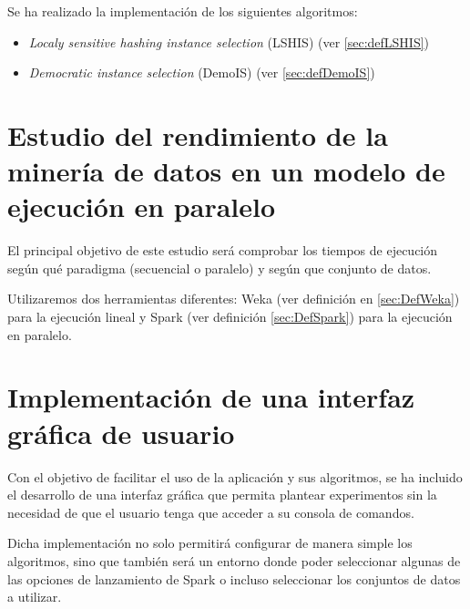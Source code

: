 Se ha realizado la implementación de los siguientes algoritmos:

\begin{itemize}
	\item \textit{Localy sensitive hashing instance selection} (LSHIS) (ver \ref{sec:defLSHIS}) \cite{LSHISPaper}
	\item \textit{Democratic instance selection} (DemoIS) (ver \ref{sec:defDemoIS}) \cite{DemoISPaper}
\end{itemize}


\section{Estudio del rendimiento de la minería de datos en un modelo de ejecución en paralelo}

El principal objetivo de este estudio será comprobar los tiempos de ejecución según qué paradigma (secuencial o paralelo) y según que conjunto de datos.

Utilizaremos dos herramientas diferentes: Weka (ver definición en \ref{sec:DefWeka}) para la ejecución lineal y Spark (ver definición \ref{sec:DefSpark}) para la ejecución en paralelo.




\section{Implementación de una interfaz gráfica de usuario}

Con el objetivo de facilitar el uso de la aplicación y sus algoritmos, se ha incluido el desarrollo de una interfaz gráfica que permita plantear experimentos sin la necesidad de que el usuario tenga que acceder a su consola de comandos.

Dicha implementación no solo permitirá configurar de manera simple los algoritmos, sino que también será un entorno donde poder seleccionar algunas de las opciones de lanzamiento de Spark o incluso seleccionar los conjuntos de datos a utilizar.

